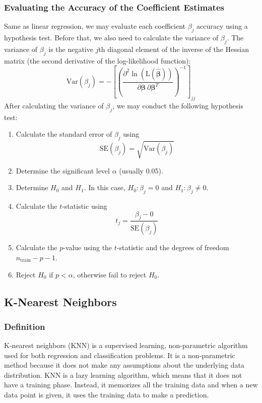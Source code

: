 \documentclass[conf]{new-aiaa}
\begin{document}
\subsubsection{Evaluating the Accuracy of the Coefficient Estimates}
Same as linear regression, we may evaluate each coefficient $\beta_j$ accuracy using a hypothesis test. Before that, we also need to calculate the variance of $\beta_j$. The variance of $\beta_j$ is the negative $j$th diagonal element of the inverse of the Hessian matrix (the second derivative of the log-likelihood function):
\begin{equation} \label{eq:logregvar}
    \textrm{Var}(\beta_j) = -\left[\left(\frac{\partial^2 \ln \left(\textrm{L}(\boldsymbol{\hat{\beta}})\right)}{\partial \boldsymbol{\beta}\ \partial \boldsymbol{\beta}^T}\right)^{-1}\right]_{jj}
\end{equation}
After calculating the variance of $\beta_j$, we may conduct the following hypothesis test:
\begin{enumerate}
    \item Calculate the standard error of $\beta_j$ using
    \begin{equation} \label{eq:logregse}
        \textrm{SE}(\beta_j) = \sqrt{\textrm{Var}(\beta_j)}
    \end{equation}
    \item Determine the significant level $\alpha$ (usually 0.05).
    \item Determine $H_0$ and $H_1$. In this case, $H_0: \beta_j = 0$ and $H_1: \beta_j \neq 0$.
    \item Calculate the $t$-statistic using
    \begin{equation} \label{eq:logregtstat}
        t_j = \frac{\beta_j - 0}{\textrm{SE}(\beta_j)}
    \end{equation}
    \item Calculate the $p$-value using the $t$-statistic and the degrees of freedom $n_{\textrm{train}} - p - 1$.
    \item Reject $H_0$ if $p < \alpha$, otherwise fail to reject $H_0$.
\end{enumerate}
\subsection{K-Nearest Neighbors}
\subsubsection{Definition}
K-nearest neighbors (KNN) is a supervised learning, non-parametric algorithm used for both regression and classification problems. It is a non-parametric method because it does not make any assumptions about the underlying data distribution. KNN is a lazy learning algorithm, which means that it does not have a training phase. Instead, it memorizes all the training data and when a new data point is given, it uses the training data to make a prediction.
\end{document}
